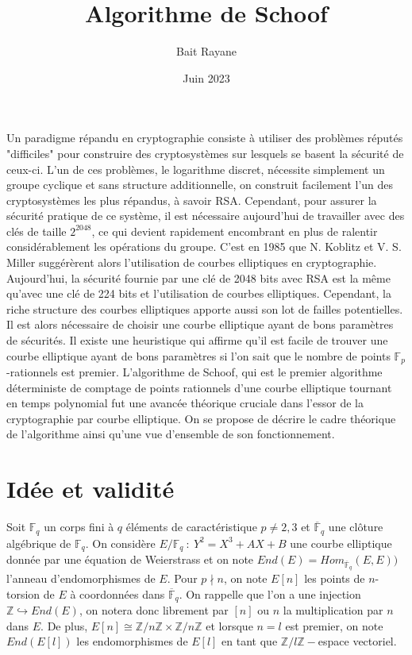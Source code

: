 \documentclass{article}
\title{Algorithme de Schoof}
\author{Bait Rayane}
\date{Juin 2023}
\theoremstyle{definition}
\theoremstyle{plain}
\begin{document}
\maketitle
    Un paradigme répandu en cryptographie consiste à utiliser des problèmes réputés "difficiles" pour construire des cryptosystèmes sur lesquels se basent la sécurité de ceux-ci. L'un de ces problèmes, le logarithme discret, nécessite simplement un groupe cyclique et sans structure additionnelle, on construit facilement l'un des cryptosystèmes les plus répandus, à savoir RSA. Cependant, pour assurer la sécurité pratique de ce système, il est nécessaire aujourd'hui de travailler avec des clés de taille $2^{2048}$, ce qui devient rapidement encombrant en plus de ralentir considérablement les opérations du groupe. C'est en 1985 que N. Koblitz et V. S. Miller suggérèrent alors l'utilisation de courbes elliptiques en cryptographie. Aujourd'hui, la sécurité fournie par une clé de 2048 bits avec RSA est la même qu'avec une clé de 224 bits et l'utilisation de courbes elliptiques. Cependant, la riche structure des courbes elliptiques apporte aussi son lot de failles potentielles. Il est alors nécessaire de choisir une courbe elliptique ayant de bons paramètres de sécurités. Il existe une heuristique qui affirme qu'il est facile de trouver une courbe elliptique ayant de bons paramètres si l'on sait que le nombre de points $\mathbb{F}_p$-rationnels est premier. L'algorithme de Schoof, qui est le premier algorithme déterministe de comptage de points rationnels d'une courbe elliptique tournant en temps polynomial fut une avancée théorique cruciale dans l'essor de la cryptographie par courbe elliptique. On se propose de décrire le cadre théorique de l'algorithme ainsi qu'une vue d'ensemble de son fonctionnement.

\section{Idée et validité} 
    \indent \indent Soit $\mathbb{F}_q$ un corps fini à $q$ éléments de caractéristique $p\ne 2,3$ et $\overline{\mathbb{F}}_q$ une clôture algébrique de $\mathbb{F}_q$. On considère $E/\mathbb{F}_q~:~Y^2=X^3+AX+B$ une courbe elliptique donnée par une équation de Weierstrass et on note $End(E)=Hom_{\overline{\mathbb{F}}_q}(E,E))$ l'anneau d'endomorphismes de $E$. Pour $p\nmid n$, on note $E[n]$ les points de $n$-torsion de $E$ à coordonnées dans $\overline{\mathbb{F}}_q$. On rappelle que l'on a une injection $\mathbb{Z}\hookrightarrow End(E)$, on notera donc librement par $[n]$ ou $n$ la multiplication par $n$ dans $E$. De plus, $E[n]\cong \mathbb{Z}/n\mathbb{Z}\times \mathbb{Z}/n\mathbb{Z}$ et lorsque $n=l$ est premier, on note $End(E[l])$ les endomorphismes de $E[l]$ en tant que $\mathbb{Z}/l\mathbb{Z}-$espace vectoriel.
    
\end{document}
